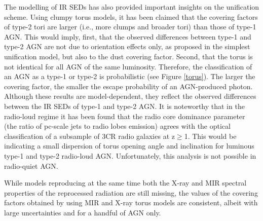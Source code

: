 \documentclass{natureprintstyle}
\begin{document}
The modelling of IR SEDs has also provided important insights on the unification scheme. {Using clumpy torus models, it has been claimed} that the covering factors of type-2 
tori are larger (i.e., more clumps and broader tori) than those of type-1 AGN\cite{Ramos11,Ichikawa15,Alonso11,Mateos16}. %
{This would imply,} first, that the observed differences between type-1 and type-2 AGN are not due to orientation effects only, as proposed in the simplest unification model, but also to {the dust covering factor}. 
Second, that the torus is not identical for all AGN of the same luminosity. Therefore, the classification of an AGN as a type-1 or type-2 is probabilistic\cite{Elitzur12} (see Figure \ref{torus}). 
The larger the covering factor, the smaller the escape probability of an AGN-produced photon. Although these results are model-dependent, they reflect the observed differences between the IR 
SEDs of type-1 and type-2 AGN. It is noteworthy that in the radio-loud regime it has been found that the radio core dominance parameter (the ratio of pc-scale jets to radio lobes emission) 
agrees with the optical classification of a subsample of 3CR radio galaxies at z$\geq$1\cite{Marin2016}. This would be indicating a small dispersion of torus opening angle and inclination for 
luminous type-1 and type-2 radio-loud AGN. Unfortunately, this analysis is not possible in radio-quiet AGN.

While models reproducing at the same time both the X-ray and MIR spectral properties of the reprocessed radiation are still missing, the values of the covering factors obtained by using 
MIR\cite{Alonso11,Lira13,Ichikawa15} and X-ray torus models are consistent\cite{Brightman:2015hb}, albeit with large uncertainties and for a handful of AGN only. 





\end{document}
